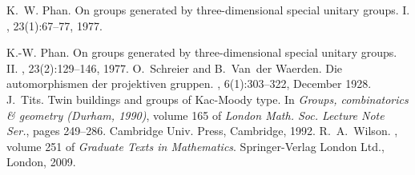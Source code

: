 \documentclass[12pt]{amsart}
\theoremstyle{definition}
\begin{document}
\begin{thebibliography}{10}
K.~W. Phan.
\newblock On groups generated by three-dimensional special unitary groups. {I}.
, 23(1):67--77, 1977.

K.-W. Phan.
\newblock On groups generated by three-dimensional special unitary groups.
  {II}.
, 23(2):129--146, 1977.
%
%
O.~Schreier and B.~Van~der Waerden.
\newblock Die automorphismen der projektiven gruppen.
, 6(1):303--322, December 1928.
%
J.~Tits.
\newblock Twin buildings and groups of {K}ac-{M}oody type.
\newblock In {\em Groups, combinatorics \& geometry (Durham, 1990)}, volume 165
  of {\em London Math. Soc. Lecture Note Ser.}, pages 249--286. Cambridge Univ.
  Press, Cambridge, 1992.
%
R.~A.~Wilson.
, volume 251 of {\em Graduate Texts in
  Mathematics}.
\newblock Springer-Verlag London Ltd., London, 2009.
%

\end{thebibliography}
\end{document}
